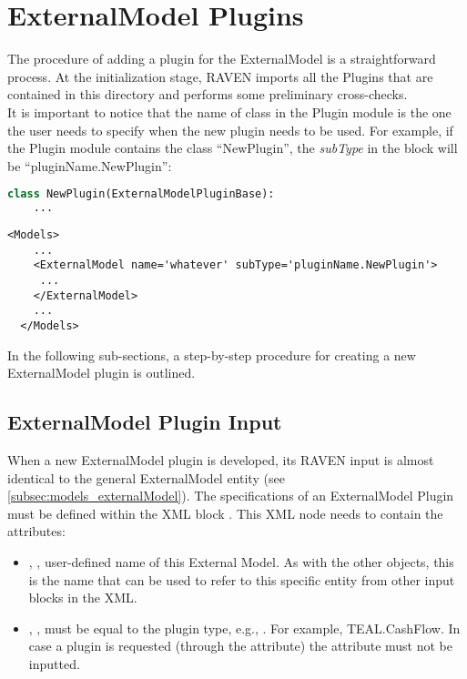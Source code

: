 \section{ExternalModel Plugins}
\label{sec:newExternalModelPlugin}

The procedure of adding a plugin for the ExternalModel is a straightforward process.
At the initialization stage, RAVEN imports all the Plugins that are contained in this directory and performs some preliminary cross-checks.
\\It is important to notice that the name of class in the Plugin module is the one the user needs to specify when the new plugin
needs to be used. For example, if the Plugin module contains the class 	``NewPlugin'', the \textit{subType}
in the  block will be 	``pluginName.NewPlugin'':
\begin{lstlisting}[language=python]
  class NewPlugin(ExternalModelPluginBase):
    ...
\end{lstlisting}
\begin{lstlisting}[style=XML,morekeywords={name,file}] %moreemph={name,file}]
  <Models>
    ...
    <ExternalModel name='whatever' subType='pluginName.NewPlugin'>
     ...
    </ExternalModel>
    ...
  </Models>
\end{lstlisting}

In the following sub-sections, a step-by-step procedure for creating a new ExternalModel plugin is outlined.

\subsection{ExternalModel Plugin Input}
\label{subsec:externalModelPluginInput}
When a new ExternalModel plugin is developed, its RAVEN input is almost identical
to the general ExternalModel entity (see \ref{subsec:models_externalModel}).
The specifications of an ExternalModel Plugin must be defined within the XML block
.
%
This XML node needs to contain the attributes:

\vspace{-5mm}
\begin{itemize}
  \itemsep0em
  \item {}, , user-defined name
  of this External Model.
  \nb As with the other objects, this is the name that can be used to refer to
  this specific entity from other input blocks in the XML.
  \item {}, , must be equal to the
  plugin type, e.g., . For example, TEAL.CashFlow.
  \nb In case a plugin is requested (through the   attribute) the
  attribute  must not be inputted.
\end{itemize}
\vspace{-5mm}

